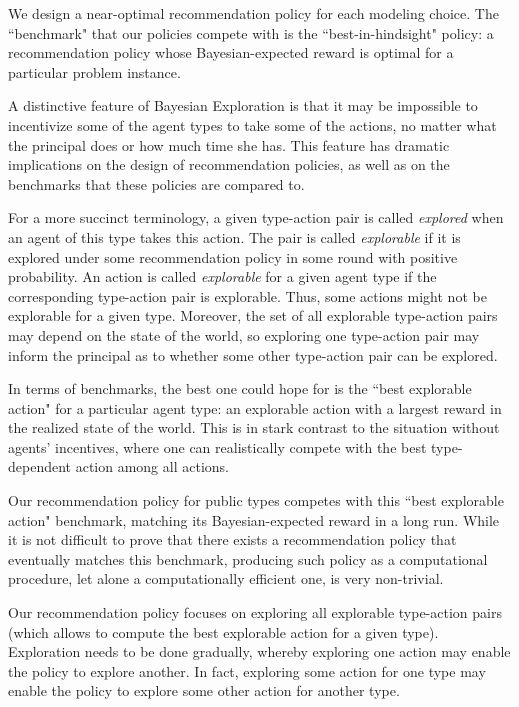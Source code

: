 We design a near-optimal recommendation policy for each modeling choice. The ``benchmark" that our policies compete with is the ``best-in-hindsight"
policy: a recommendation policy whose Bayesian-expected reward is optimal for a particular problem instance.  


A distinctive feature of Bayesian Exploration is that it may be impossible to incentivize some of the agent types to take some of the actions, no matter what the principal does or how much time she has. This feature has dramatic implications on the design of recommendation policies, as well as on the benchmarks that these policies are compared to.

For a more succinct terminology, a given type-action pair is called \emph{explored} when an agent of this type takes this action. The pair is called \emph{explorable} if it is explored under some recommendation policy in some round with positive probability. An action is called \emph{explorable} for a given agent type if the corresponding type-action pair is explorable. Thus, some actions might not be explorable for a given type. Moreover, the set of all explorable type-action pairs may depend on the state of the world, so  exploring one type-action pair may inform the principal as to whether some other type-action pair can be explored.

In terms of benchmarks, the best one could hope for is the ``best explorable action" for a particular agent type: an explorable action with a largest reward in the realized state of the world. This is in stark contrast to the situation without agents' incentives, where one can realistically compete with the best type-dependent action among all actions.

Our recommendation policy for public types competes with this ``best explorable action" benchmark, matching its Bayesian-expected reward in a long run. While it is not difficult to prove that there exists a recommendation policy that eventually matches this benchmark, producing such policy as a computational procedure, let alone a computationally efficient one, is very non-trivial.

Our recommendation policy focuses on exploring all explorable type-action pairs (which allows to compute the best explorable action for a given type). Exploration needs to be done gradually, whereby exploring one action may enable the policy to explore another. In fact, exploring some action for one type may enable the policy to explore some other action for another type.




